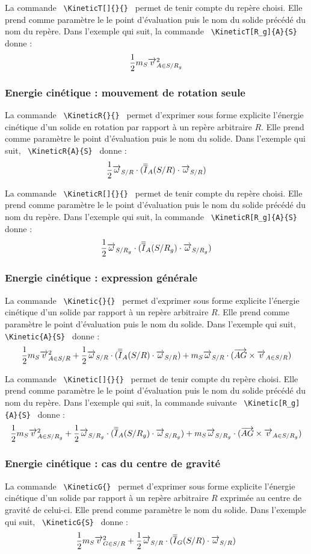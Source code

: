 \documentclass[12pt]{article}
\begin{document}
La commande \verb| \KineticT[]{}{} | permet de tenir compte du repère choisi. Elle prend comme paramètre le le point d'évaluation puis le nom du solide précédé du nom du repère. Dans l'exemple qui suit, la commande \verb| \KineticT[R_g]{A}{S} | donne : $$\KineticT[R_g]{A}{S}$$

\subsubsection{Energie cinétique : mouvement de rotation seule}
La commande \verb| \KineticR{}{} | permet d'exprimer sous forme explicite l'énergie cinétique d'un solide en rotation par rapport à un repère arbitraire $R$. Elle prend comme paramètre le point d'évaluation puis le nom du solide. Dans l'exemple qui suit, \verb| \KineticR{A}{S} | donne : $$\KineticR{A}{S}$$

La commande \verb| \KineticR[]{}{} | permet de tenir compte du repère choisi. Elle prend comme paramètre le le point d'évaluation puis le nom du solide précédé du nom du repère. Dans l'exemple qui suit, la commande \verb| \KineticR[R_g]{A}{S} | donne : $$\KineticR[R_g]{A}{S}$$

\subsubsection{Energie cinétique : expression générale}
La commande \verb| \Kinetic{}{} | permet d'exprimer sous forme explicite l'énergie cinétique d'un solide par rapport à un repère arbitraire $R$. Elle prend comme paramètre le point d'évaluation puis le nom du solide. Dans l'exemple qui suit, \verb| \Kinetic{A}{S} | donne : $$\Kinetic{A}{S}$$

La commande \verb| \Kinetic[]{}{} | permet de tenir compte du repère choisi. Elle prend comme paramètre le le point d'évaluation puis le nom du solide précédé du nom du repère. Dans l'exemple qui suit, la commande suivante \verb| \Kinetic[R_g]{A}{S} | donne : $$\Kinetic[R_g]{A}{S}$$

\subsubsection{Energie cinétique : cas du centre de gravité}
La commande \verb| \KineticG{} | permet d'exprimer sous forme explicite l'énergie cinétique d'un solide par rapport à un repère arbitraire $R$ exprimée au centre de gravité de celui-ci. Elle prend comme paramètre le nom du solide. Dans l'exemple qui suit, \verb| \KineticG{S} | donne : $$\KineticG{S}$$
\end{document}
